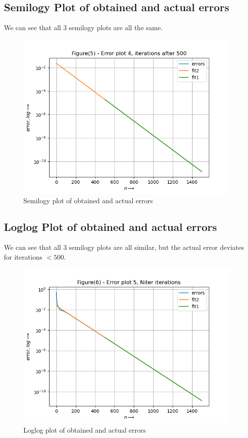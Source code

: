 \documentclass[11pt]{article}
\begin{document}
\subsection{Semilogy Plot of obtained and actual errors}
We can see that all 3 semilogy plots are all the same.
\begin{figure}[H]
    \centering
    \includegraphics[scale = 1]{Figure_5.png}
    \caption{Semilogy plot of obtained and actual errors}
\end{figure}

\subsection{Loglog Plot of obtained and actual errors}
We can see that all 3 semilogy plots are all similar, but the actual error deviates for iterations $<500$.
\begin{figure}[H]
    \centering
    \includegraphics[scale = 1]{Figure_6.png}
    \caption{Loglog plot of obtained and actual errors}
\end{figure}
\end{document}
